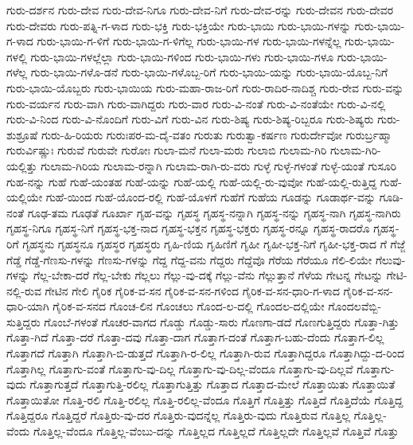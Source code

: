 {ಗುರು-ದರ್ಶನ
ಗುರು-ದೇವ
ಗುರು-ದೇವ-ನಿಗೂ
ಗುರು-ದೇವ-ನಿಗೆ
ಗುರು-ದೇವ-ರನ್ನು
ಗುರು-ದೇವನ
ಗುರು-ದೇವರ
ಗುರು-ದೇವರು
ಗುರು-ಪತ್ನಿ-ಗ-ಳಾದ
ಗುರು-ಭಕ್ತಿ
ಗುರು-ಭಕ್ತಿಯೇ
ಗುರು-ಭಾಯಿ
ಗುರು-ಭಾಯಿ-ಗಳನ್ನು
ಗುರು-ಭಾಯಿ-ಗ-ಳಾದ
ಗುರು-ಭಾಯಿ-ಗ-ಳಿಗೆ
ಗುರು-ಭಾಯಿ-ಗ-ಳಿಗೆಲ್ಲ
ಗುರು-ಭಾಯಿ-ಗಳ
ಗುರು-ಭಾಯಿ-ಗಳನ್ನೆಲ್ಲ
ಗುರು-ಭಾಯಿ-ಗಳಲ್ಲಿ
ಗುರು-ಭಾಯಿ-ಗಳಲ್ಲೆಲ್ಲಾ
ಗುರು-ಭಾಯಿ-ಗಳಿಂದ
ಗುರು-ಭಾಯಿ-ಗಳು
ಗುರು-ಭಾಯಿ-ಗಳೂ
ಗುರು-ಭಾಯಿ-ಗಳೆಲ್ಲ
ಗುರು-ಭಾಯಿ-ಗಳೊ-ಡನೆ
ಗುರು-ಭಾಯಿ-ಗಳೊಬ್ಬ-ರಿಗೆ
ಗುರು-ಭಾಯಿ-ಯನ್ನು
ಗುರು-ಭಾಯಿ-ಯೊಬ್ಬ-ನಿಗೆ
ಗುರು-ಭಾಯಿ-ಯೊಬ್ಬರು
ಗುರು-ಭಾಯಿಯ
ಗುರು-ಮಹಾ-ರಾಜ-ರಿಗೆ
ಗುರು-ರಾದಿರ-ನಾದಿಶ್ಚ
ಗುರು-ರೇವ
ಗುರು-ವನ್ನು
ಗುರು-ವರ್ಯನ
ಗುರು-ವಾಗಿ
ಗುರು-ವಾಗಿದ್ದರು
ಗುರು-ವಾರ
ಗುರು-ವಿ-ನಂತೆ
ಗುರು-ವಿ-ನಂತೆಯೇ
ಗುರು-ವಿ-ನಲ್ಲಿ
ಗುರು-ವಿ-ನಿಂದ
ಗುರು-ವಿ-ನೊಂದಿಗೆ
ಗುರು-ವಿಗೆ
ಗುರು-ವಿನ
ಗುರು-ಶಿಷ್ಯ
ಗುರು-ಶಿಷ್ಯ-ರಿಬ್ಬರೂ
ಗುರು-ಶಿಷ್ಯರು
ಗುರು-ಶುಶ್ರೂಷೆ
ಗುರು-ಹಿ-ರಿಯರು
ಗುರುಃಪರ-ಮ-ದೈ-ವತಂ
ಗುರುತು
ಗುರುತ್ವಾ-ಕರ್ಷಣ
ಗುರುರ್ದೇವೋ
ಗುರುರ್ಬ್ರಹ್ಮಾ
ಗುರುರ್ವಿಷ್ಣುಃ
ಗುರುವೆ
ಗುರುವೇ
ಗುರೋಃ
ಗುಲಾ-ಮನೆ
ಗುಲಾ-ಮರು
ಗುಲಾಬಿ
ಗುಲಾಮ-ಗಿರಿ
ಗುಲಾಮ-ಗಿರಿ-ಯಲ್ಲಿತ್ತು
ಗುಲಾಮ-ಗಿರಿಯ
ಗುಲಾಮ-ರನ್ನಾಗಿ
ಗುಲಾಮ-ರಾಗಿ-ರು-ವರು
ಗುಳ್ಳೆ
ಗುಳ್ಳೆ-ಗಳಂತೆ
ಗುಳ್ಳೆ-ಯಂತೆ
ಗುಸೂರಿ
ಗುಹ-ನನ್ನು
ಗುಹೆ
ಗುಹೆ-ಯಂತಹ
ಗುಹೆ-ಯನ್ನು
ಗುಹೆ-ಯಲ್ಲಿ
ಗುಹೆ-ಯಲ್ಲಿ-ರು-ವುವೋ
ಗುಹೆ-ಯಲ್ಲಿ-ರುತ್ತಿದ್ದ
ಗುಹೆ-ಯಲ್ಲಿಯೇ
ಗುಹೆ-ಯಿಂದ
ಗುಹೆ-ಯೊಂದ-ರಲ್ಲಿ
ಗುಹೆ-ಯೊಳಗೆ
ಗುಹೆಗೆ
ಗುಹೆಯ
ಗೂಡನ್ನು
ಗೂಡಾರ್ಥ-ವನ್ನು
ಗೂಡಿ-ನಂತೆ
ಗೂಢ-ತಮ
ಗೂಢತೆ
ಗೂರ್ಖಾ
ಗೃಹ-ವನ್ನು
ಗೃಹಸ್ಥ
ಗೃಹಸ್ಥ-ನನ್ನಾಗಿ
ಗೃಹಸ್ಥ-ನನ್ನು
ಗೃಹಸ್ಥ-ನಾಗಿ
ಗೃಹಸ್ಥ-ನಾಗಿರು
ಗೃಹಸ್ಥ-ನಿಗೂ
ಗೃಹಸ್ಥ-ನಿಗೆ
ಗೃಹಸ್ಥ-ಭಕ್ತ-ನಾದ
ಗೃಹಸ್ಥ-ಭಕ್ತನ
ಗೃಹಸ್ಥ-ಭಕ್ತರು
ಗೃಹಸ್ಥ-ರನ್ನೂ
ಗೃಹಸ್ಥ-ರಾದರೊ
ಗೃಹಸ್ಥ-ರಿಗೆ
ಗೃಹಸ್ಥನು
ಗೃಹಸ್ಥನೂ
ಗೃಹಸ್ಥರ
ಗೃಹಸ್ಥರು
ಗೃಹಿ-ಣಿಯ
ಗೃಹಿಣಿಗೆ
ಗೃಹೀ
ಗೃಹೀ-ಭಕ್ತ-ನಿಗೆ
ಗೃಹೀ-ಭಕ್ತ-ರಾದ
ಗೆ
ಗೆಜ್ಜೆ
ಗೆಡ್ಡೆ
ಗೆಡ್ಡೆ-ಗೆಣಸು-ಗಳನ್ನು
ಗೆಣಸು-ಗಳನ್ನು
ಗೆದ್ದ
ಗೆದ್ದ-ವನು
ಗೆದ್ದರು
ಗೆದ್ದೆವೊ
ಗೆರೆಯ
ಗೆರೆಯೂ
ಗೆಲಿ-ಲಿಯೇ
ಗೆಲುವು-ಗಳನ್ನು
ಗೆಲ್ಲ-ಬೇಕಾ-ದರೆ
ಗೆಲ್ಲ-ಬೇಕು
ಗೆಲ್ಲಲು
ಗೆಲ್ಲು-ವು-ದಕ್ಕೆ
ಗೆಲ್ಲು-ವೆನು
ಗೆಲ್ಲುತ್ತಾನೆ
ಗೆಳೆಯ
ಗೇಟನ್ನ
ಗೇಟನ್ನು
ಗೇಟಿ-ನಲ್ಲಿ-ರುವ
ಗೇಟಿನ
ಗೇಲಿ
ಗೈರಿಕ
ಗೈರಿಕ-ವ-ಸನ
ಗೈರಿಕ-ವ-ಸನ-ಗಳಿಂದ
ಗೈರಿಕ-ವ-ಸನ-ಧಾರಿ-ಗ-ಳಾದ
ಗೈರಿಕ-ವ-ಸನ-ಧಾರಿ-ಯಾಗಿ
ಗೈರಿಕ-ವ-ಸನದ
ಗೊಂಚ-ಲಿನ
ಗೊಂಚಲು
ಗೊಂದ-ಲ-ದಲ್ಲಿ
ಗೊಂದಲ-ದಲ್ಲಿಯೇ
ಗೊಂದಲವೆಬ್ಬಿ-ಸುತ್ತಿದ್ದರು
ಗೊಂಬೆ-ಗಳಂತೆ
ಗೊಚರ-ವಾಗದ
ಗೊಡ್ಡು
ಗೊಡ್ಡು-ಸಾರು
ಗೊಣಗಾ-ಡದೆ
ಗೊಣಗುತ್ತಿದ್ದರು
ಗೊತ್ತಾ-ಗಿತ್ತು
ಗೊತ್ತಾ-ಗಿದೆ
ಗೊತ್ತಾ-ದರೆ
ಗೊತ್ತಾ-ದವು
ಗೊತ್ತಾ-ದಾಗ
ಗೊತ್ತಾಗ-ದಂತೆ
ಗೊತ್ತಾಗ-ಬಹು-ದೆಂದು
ಗೊತ್ತಾಗ-ಲಿಲ್ಲ
ಗೊತ್ತಾಗದೆ
ಗೊತ್ತಾಗಿ
ಗೊತ್ತಾಗಿ-ಬಿ-ಡುತ್ತದೆ
ಗೊತ್ತಾಗಿ-ರ-ಲಿಲ್ಲ
ಗೊತ್ತಾಗಿ-ರುವ
ಗೊತ್ತಾಗಿದ್ದರೂ
ಗೊತ್ತಾಗಿದ್ದು-ದ-ರಿಂದ
ಗೊತ್ತಾಗಿಲ್ಲ
ಗೊತ್ತಾಗು-ವಂತೆ
ಗೊತ್ತಾಗು-ವು-ದಿಲ್ಲ
ಗೊತ್ತಾಗು-ವು-ದಿಲ್ಲ-ವೆಂದೂ
ಗೊತ್ತಾಗು-ವು-ದಿಲ್ಲವೆ
ಗೊತ್ತಾಗು-ವುದು
ಗೊತ್ತಾಗುತ್ತದೆ
ಗೊತ್ತಾಗುತ್ತಿ-ರಲಿಲ್ಲ
ಗೊತ್ತಾಗುತ್ತಿತ್ತು
ಗೊತ್ತಾದ
ಗೊತ್ತಾದ-ಮೇಲೆ
ಗೊತ್ತಾಯಿತು
ಗೊತ್ತಾಯಿತೆ
ಗೊತ್ತಾಯಿತೋ
ಗೊತ್ತಿ-ರಲಿ
ಗೊತ್ತಿ-ರಲಿಲ್ಲ
ಗೊತ್ತಿ-ರಲಿಲ್ಲ-ವೆಂದೂ
ಗೊತ್ತಿಗೆ
ಗೊತ್ತಿತ್ತು
ಗೊತ್ತಿದೆ
ಗೊತ್ತಿದೆಯೆ
ಗೊತ್ತಿದ್ದ
ಗೊತ್ತಿದ್ದರೂ
ಗೊತ್ತಿದ್ದರೆ
ಗೊತ್ತಿರು-ವು-ದರ
ಗೊತ್ತಿರು-ವುದನ್ನೆಲ್ಲ
ಗೊತ್ತಿರು-ವುದು
ಗೊತ್ತಿರುವ
ಗೊತ್ತಿಲ್ಲ
ಗೊತ್ತಿಲ್ಲ-ವೆಂದು
ಗೊತ್ತಿಲ್ಲ-ವೆಂದೂ
ಗೊತ್ತಿಲ್ಲ-ವೆಂಬು-ದನ್ನು
ಗೊತ್ತಿಲ್ಲದ
ಗೊತ್ತಿಲ್ಲದೆ
ಗೊತ್ತಿಲ್ಲದೇ
ಗೊತ್ತಿಲ್ಲವೆ
ಗೊತ್ತಿವೆ
ಗೊತ್ತು
}
